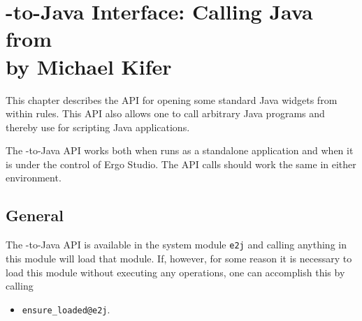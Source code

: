 \chapter[\ERGO-to-Java Interface]
{\ERGO-to-Java Interface: Calling Java from \ERGO\\
  {\Large by Michael Kifer}}


This chapter describes the API for opening some standard Java widgets from
within \ERGO rules. This API also allows one to call arbitrary Java
programs and thereby use \ERGO for scripting Java applications.

The \ERGO-to-Java API works both when \ERGO runs as a standalone
application and when it is under the control of Ergo Studio.
The API calls should work the same in either environment.

\section{General}

The \ERGO-to-Java API is available in the system module \texttt{\bs{}e2j}
and calling anything in this module will load that module. If, however, for
some reason it is necessary to load this module without executing any
operations, one can accomplish this by calling 
\begin{itemize}
\item  \texttt{ensure\_loaded@\bs{}e2j}. 
\end{itemize}

